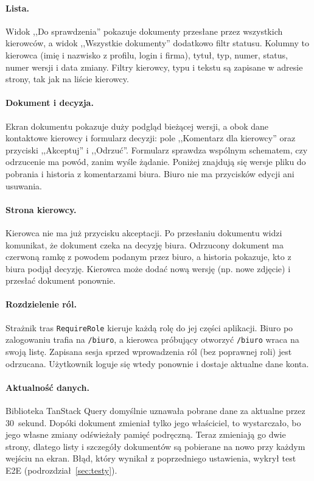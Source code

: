 \paragraph{Lista.} Widok ,,Do sprawdzenia'' pokazuje dokumenty przesłane przez
wszystkich kierowców, a widok ,,Wszystkie dokumenty'' dodatkowo filtr statusu.
Kolumny to kierowca (imię i nazwisko z profilu, login i firma), tytuł, typ,
numer, status, numer wersji i data zmiany. Filtry kierowcy, typu i tekstu są
zapisane w adresie strony, tak jak na liście kierowcy.

\paragraph{Dokument i decyzja.} Ekran dokumentu pokazuje duży podgląd bieżącej
wersji, a obok dane kontaktowe kierowcy i formularz decyzji: pole ,,Komentarz
dla kierowcy'' oraz przyciski ,,Akceptuj'' i ,,Odrzuć''. Formularz sprawdza
wspólnym schematem, czy odrzucenie ma powód, zanim wyśle żądanie. Poniżej
znajdują się wersje pliku do pobrania i historia z komentarzami biura.
Biuro nie ma przycisków edycji ani usuwania.

\paragraph{Strona kierowcy.} Kierowca nie ma już przycisku akceptacji. Po
przesłaniu dokumentu widzi komunikat, że dokument czeka na decyzję biura.
Odrzucony dokument ma czerwoną ramkę z powodem podanym przez biuro, a historia
pokazuje, kto z biura podjął decyzję. Kierowca może dodać nową wersję
(np. nowe zdjęcie) i przesłać dokument ponownie.

\paragraph{Rozdzielenie ról.} Strażnik tras \texttt{RequireRole} kieruje każdą
rolę do jej części aplikacji. Biuro po zalogowaniu trafia na \texttt{/biuro},
a kierowca próbujący otworzyć \texttt{/biuro} wraca na swoją listę. Zapisana
sesja sprzed wprowadzenia ról (bez poprawnej roli) jest odrzucana.
Użytkownik loguje się wtedy ponownie i dostaje aktualne dane konta.

\paragraph{Aktualność danych.} Biblioteka TanStack Query domyślnie uznawała
pobrane dane za aktualne przez 30~sekund. Dopóki dokument zmieniał tylko jego
właściciel, to wystarczało, bo jego własne zmiany odświeżały pamięć
podręczną. Teraz zmieniają go dwie strony, dlatego listy i szczegóły
dokumentów są pobierane na nowo przy każdym wejściu na ekran. Błąd, który wynikał
z poprzedniego ustawienia, wykrył test E2E (podrozdział~\ref{sec:testy}).

